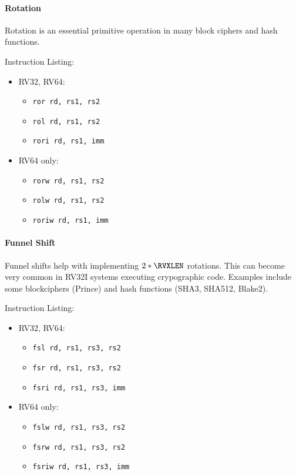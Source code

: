 \paragraph{Rotation}
Rotation is an essential primitive operation in many block ciphers and
hash functions.

Instruction Listing:
\begin{itemize}
\item RV32, RV64:
\begin{itemize}
\item {\tt ror  rd, rs1, rs2}
\item {\tt rol  rd, rs1, rs2}
\item {\tt rori rd, rs1, imm}
\end{itemize}
\item RV64 only:
\begin{itemize}
\item {\tt rorw  rd, rs1, rs2}
\item {\tt rolw  rd, rs1, rs2}
\item {\tt roriw rd, rs1, imm}
\end{itemize}
\end{itemize}

\paragraph{Funnel Shift}
Funnel shifts help with implementing $2*\RVXLEN$ rotations.
This can become very common in RV32I systems executing crypographic code.
Examples include some blockciphers (Prince) and
hash functions (SHA3, SHA512, Blake2).

Instruction Listing:
\begin{itemize}
\item RV32, RV64:
\begin{itemize}
\item {\tt fsl  rd, rs1, rs3, rs2}
\item {\tt fsr  rd, rs1, rs3, rs2}
\item {\tt fsri rd, rs1, rs3, imm}
\end{itemize}
\item RV64 only:
\begin{itemize}
\item {\tt fslw  rd, rs1, rs3, rs2}
\item {\tt fsrw  rd, rs1, rs3, rs2}
\item {\tt fsriw rd, rs1, rs3, imm}
\end{itemize}
\end{itemize}


